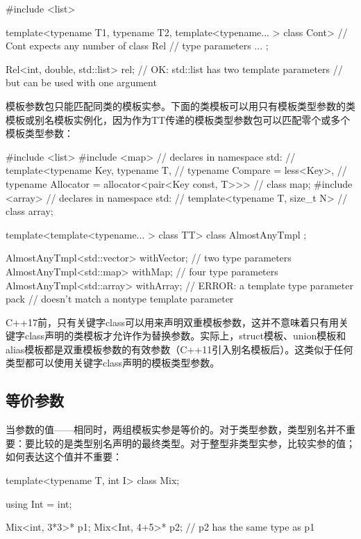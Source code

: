 \begin{cpp}
#include <list>

template<typename T1, typename T2,
		template<typename... > class Cont> // Cont expects any number of
class Rel { // type parameters
	...
};

Rel<int, double, std::list> rel; // OK: std::list has two template parameters
								// but can be used with one argument
\end{cpp}

模板参数包只能匹配同类的模板实参。下面的类模板可以用只有模板类型参数的类模板或别名模板实例化，因为作为TT传递的模板类型参数包可以匹配零个或多个模板类型参数：

\begin{cpp}
#include <list>
#include <map>
	// declares in namespace std:
	// template<typename Key, typename T,
	// typename Compare = less<Key>,
	// typename Allocator = allocator<pair<Key const, T>>>
	// class map;
#include <array>
	// declares in namespace std:
	// template<typename T, size_t N>
	// class array;
	
template<template<typename... > class TT>
class AlmostAnyTmpl {
};

AlmostAnyTmpl<std::vector> withVector; // two type parameters
AlmostAnyTmpl<std::map> withMap; // four type parameters
AlmostAnyTmpl<std::array> withArray; // ERROR: a template type parameter pack
									// doesn't match a nontype template parameter
\end{cpp}

C++17前，只有关键字class可以用来声明双重模板参数，这并不意味着只有用关键字class声明的类模板才允许作为替换参数。实际上，struct模板、union模板和alias模板都是双重模板参数的有效参数（C++11引入别名模板后）。这类似于任何类型都可以使用关键字class声明的模板类型参数。

\subsection{等价参数}

当参数的值——相同时，两组模板实参是等价的。对于类型参数，类型别名并不重要：要比较的是类型别名声明的最终类型。对于整型非类型实参，比较实参的值；如何表达这个值并不重要：

\begin{cpp}
template<typename T, int I>
class Mix;

using Int = int;

Mix<int, 3*3>* p1;
Mix<Int, 4+5>* p2; // p2 has the same type as p1
\end{cpp}

